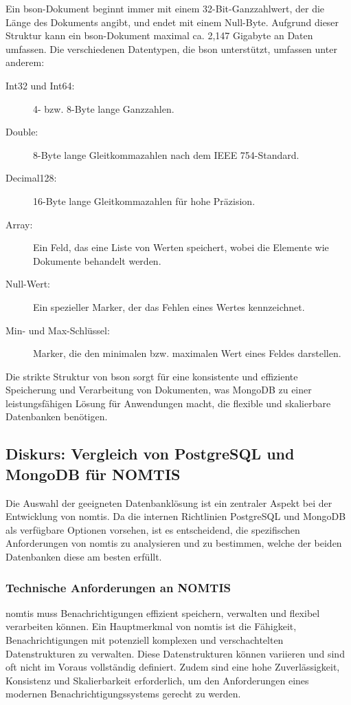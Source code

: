 Ein \ac{bson}-Dokument beginnt immer mit einem 32-Bit-Ganzzahlwert, der die Länge des Dokuments angibt, und endet mit einem Null-Byte. Aufgrund dieser Struktur kann ein \ac{bson}-Dokument maximal ca. 2,147 Gigabyte an Daten umfassen. Die verschiedenen Datentypen, die \ac{bson} unterstützt, umfassen unter anderem:
\begin{description}
    \item[Int32 und Int64:] 4- bzw. 8-Byte lange Ganzzahlen.
    \item[Double:] 8-Byte lange Gleitkommazahlen nach dem IEEE 754-Standard.
    \item[Decimal128:] 16-Byte lange Gleitkommazahlen für hohe Präzision.
    \item[Array:] Ein Feld, das eine Liste von Werten speichert, wobei die Elemente wie Dokumente behandelt werden.
    \item[Null-Wert:] Ein spezieller Marker, der das Fehlen eines Wertes kennzeichnet.
    \item[Min- und Max-Schlüssel:] Marker, die den minimalen bzw. maximalen Wert eines Feldes darstellen.
\end{description}

Die strikte Struktur von \ac{bson} sorgt für eine konsistente und effiziente Speicherung und Verarbeitung von Dokumenten, was MongoDB zu einer leistungsfähigen Lösung für Anwendungen macht, die flexible und skalierbare Datenbanken benötigen. \cite{Velikhov}

\subsection{Diskurs: Vergleich von PostgreSQL und MongoDB für NOMTIS}
Die Auswahl der geeigneten Datenbanklösung ist ein zentraler Aspekt bei der Entwicklung von \ac{nomtis}. Da die internen Richtlinien PostgreSQL und MongoDB als verfügbare Optionen vorsehen, ist es entscheidend, die spezifischen Anforderungen von \ac{nomtis} zu analysieren und zu bestimmen, welche der beiden Datenbanken diese am besten erfüllt.

\subsubsection{Technische Anforderungen an NOMTIS}
\ac{nomtis} muss Benachrichtigungen effizient speichern, verwalten und flexibel verarbeiten können. Ein Hauptmerkmal von \ac{nomtis} ist die Fähigkeit, Benachrichtigungen mit potenziell komplexen und verschachtelten Datenstrukturen zu verwalten. Diese Datenstrukturen können variieren und sind oft nicht im Voraus vollständig definiert. Zudem sind eine hohe Zuverlässigkeit, Konsistenz und Skalierbarkeit erforderlich, um den Anforderungen eines modernen Benachrichtigungssystems gerecht zu werden.

